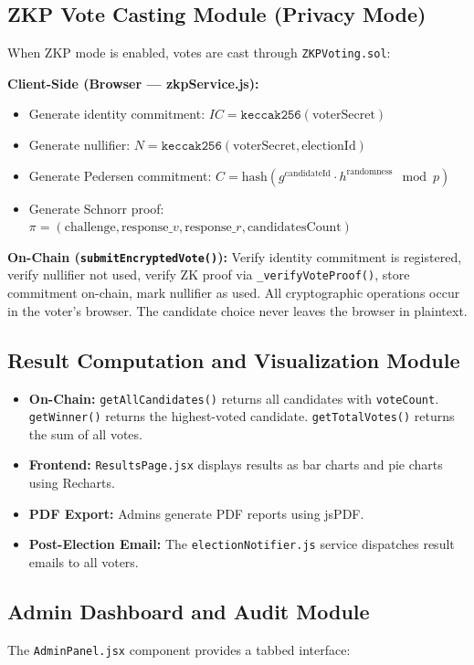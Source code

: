 \documentclass[oneside,a4paper,12pt]{book}
\begin{document}
\subsection{ZKP Vote Casting Module (Privacy Mode)}
When ZKP mode is enabled, votes are cast through \texttt{ZKPVoting.sol}:

\textbf{Client-Side (Browser --- zkpService.js):}
\begin{itemize}[leftmargin=1.5cm]
    \item Generate identity commitment: $IC = \texttt{keccak256}(\text{voterSecret})$
    \item Generate nullifier: $N = \texttt{keccak256}(\text{voterSecret}, \text{electionId})$
    \item Generate Pedersen commitment: $C = \text{hash}(g^{\text{candidateId}} \cdot h^{\text{randomness}} \mod p)$
    \item Generate Schnorr proof: $\pi = (\text{challenge}, \text{response}\_v, \text{response}\_r, \text{candidatesCount})$
\end{itemize}

\textbf{On-Chain (\texttt{submitEncryptedVote()}):} Verify identity commitment is registered, verify nullifier not used, verify ZK proof via \texttt{\_verifyVoteProof()}, store commitment on-chain, mark nullifier as used. All cryptographic operations occur in the voter's browser. The candidate choice never leaves the browser in plaintext.

\subsection{Result Computation and Visualization Module}
\begin{itemize}[leftmargin=1.5cm]
    \item \textbf{On-Chain:} \texttt{getAllCandidates()} returns all candidates with \texttt{voteCount}. \texttt{getWinner()} returns the highest-voted candidate. \texttt{getTotalVotes()} returns the sum of all votes.
    \item \textbf{Frontend:} \texttt{ResultsPage.jsx} displays results as bar charts and pie charts using Recharts.
    \item \textbf{PDF Export:} Admins generate PDF reports using jsPDF.
    \item \textbf{Post-Election Email:} The \texttt{electionNotifier.js} service dispatches result emails to all voters.
\end{itemize}

\subsection{Admin Dashboard and Audit Module}
The \texttt{AdminPanel.jsx} component provides a tabbed interface:
\end{document}
